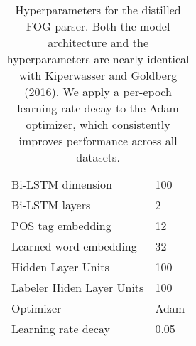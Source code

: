\documentclass[11pt,letterpaper]{article}
\newcommand{\ignore}[1]{}
\newcommand{\nascomment}[1]{\ignore{\textcolor{blue}{{\textbf{[#1 --\textsc{nas}]}}}}}
\begin{document}
\begin{table}[]
{\begin{tabular}{|l|l|}
Bi-LSTM dimension                                                        & 100                                                                  \\ Bi-LSTM layers                                                             & 2                                                                    \\ POS tag embedding                                                          & 12                                                                   \\ Learned word embedding         & 32                                                                   \\ Hidden Layer Units                                                                       & 100                                                                  \\ Labeler Hiden Layer Units                                                               & 100                                                                  \\ Optimizer                                                                  & Adam                                                                \\ Learning rate decay    & 0.05                                                                 \\ \hline
\end{tabular}
}
\caption{Hyperparameters for the distilled FOG parser. Both the model architecture and the hyperparameters are nearly identical with Kiperwasser and Goldberg (2016). We apply a per-epoch learning rate decay to the Adam optimizer, which consistently improves performance across all datasets. \ignore{MLP indicates a one hidden layer multi-layer perceptron after \nascomment{what is ``MLP''?}} \label{hyperparameters}}
\end{table}
\end{document}
